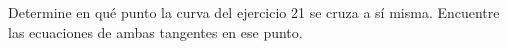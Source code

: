 \item Determine en qué punto la curva del ejercicio 21 se cruza a sí misma. Encuentre las ecuaciones de ambas tangentes en ese punto.
